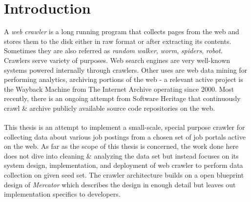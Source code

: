 \chapter{Introduction}
A \textit{web crawler} is a long running program that collects pages from the web and stores them to the
disk either in raw format or after extracting its contents. Sometimes they are also referred as
\textit{random walker}, \textit{worm}, \textit{spiders}, \textit{robot}. Crawlers serve variety of
purposes. Web search engines are very well-known systems powered internally through crawlers.
Other uses are web data mining for performing analytics, archiving portions of the web - a
relevant active project is the Wayback Machine from The Internet Archive\cite{netarchive} operating since 2000. Most recently,
there is an ongoing attempt from Software Heritage\cite{swheritage} that continuously crawl \& archive publicly available source code repositories on the web.
\\
\\
This thesis is an attempt to implement a small-scale, special purpose crawler for collecting data about
various job postings from a chosen set of job portals active on the web. As far as the scope of this thesis
is concerned, the work done here does not dive into cleaning \& analyzing the data set but instead focuses on its system design, implementation, and deployment of web crawler to perform data collection on given seed set. The crawler architecture builds on a open blueprint design of \textit{Mercator}\cite{mercator} which describes the design in enough detail but leaves out implementation specifics to developers.

\pagebreak

